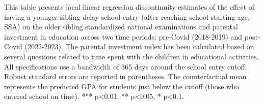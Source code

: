 \documentclass[AER]{AEA}
\begin{document}
\newpage
\begin{table}[htbp]
\centering
\caption{Effect of Younger Sibling Delayed School Entry on Standardized Exams and Parental Investment}
\label{tab:rd_ece}
\begin{tablenotes}
\footnotesize
 This table presents local linear regression discontinuity estimates of the effect of having a younger sibling delay school entry (after reaching school starting age, SSA) on the older sibling standardized national examinations and parental investment in education across two time periods: pre-Covid (2018-2019) and post-Covid (2022-2023). The parental investment index has been calculated based on several questions related to time spent with the children in educational activities. All specifications use a bandwidth of 365 days around the school entry cutoff. Robust standard errors are reported in parentheses. The counterfactual mean represents the predicted GPA for students just below the cutoff (those who entered school on time). *** p<0.01, ** p<0.05, * p<0.1.
\end{tablenotes}
\end{table}




%
\end{document}
